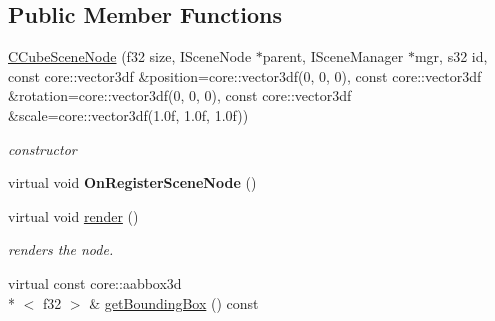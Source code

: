 \subsection*{Public Member Functions}
\begin{DoxyCompactItemize}
\item 
\hypertarget{classirr_1_1scene_1_1_c_cube_scene_node_aa1d497df6c18e8f2a4e406b26d5641fc}{\hyperlink{classirr_1_1scene_1_1_c_cube_scene_node_aa1d497df6c18e8f2a4e406b26d5641fc}{C\-Cube\-Scene\-Node} (f32 size, I\-Scene\-Node $\ast$parent, I\-Scene\-Manager $\ast$mgr, s32 id, const core\-::vector3df \&position=core\-::vector3df(0, 0, 0), const core\-::vector3df \&rotation=core\-::vector3df(0, 0, 0), const core\-::vector3df \&scale=core\-::vector3df(1.\-0f, 1.\-0f, 1.\-0f))}\label{classirr_1_1scene_1_1_c_cube_scene_node_aa1d497df6c18e8f2a4e406b26d5641fc}

\begin{DoxyCompactList}\small\item\em constructor \end{DoxyCompactList}\item 
\hypertarget{classirr_1_1scene_1_1_c_cube_scene_node_a8ecd940e83f91cd31deabd1369c06a4e}{virtual void {\bfseries On\-Register\-Scene\-Node} ()}\label{classirr_1_1scene_1_1_c_cube_scene_node_a8ecd940e83f91cd31deabd1369c06a4e}

\item 
\hypertarget{classirr_1_1scene_1_1_c_cube_scene_node_ad297aca26e44dee71f30ed267e670c00}{virtual void \hyperlink{classirr_1_1scene_1_1_c_cube_scene_node_ad297aca26e44dee71f30ed267e670c00}{render} ()}\label{classirr_1_1scene_1_1_c_cube_scene_node_ad297aca26e44dee71f30ed267e670c00}

\begin{DoxyCompactList}\small\item\em renders the node. \end{DoxyCompactList}\item 
\hypertarget{classirr_1_1scene_1_1_c_cube_scene_node_aff5f883cbeb461e3b6eea3b3dec9d544}{virtual const core\-::aabbox3d\\*
$<$ f32 $>$ \& \hyperlink{classirr_1_1scene_1_1_c_cube_scene_node_aff5f883cbeb461e3b6eea3b3dec9d544}{get\-Bounding\-Box} () const }\label{classirr_1_1scene_1_1_c_cube_scene_node_aff5f883cbeb461e3b6eea3b3dec9d544}


\end{DoxyCompactItemize}

